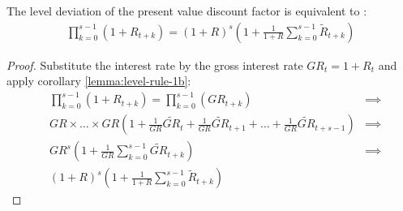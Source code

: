 \documentclass[../thesis.tex]{subfiles}
\begin{document}

\begin{lemma} \label{lemma:product-operator}
	
	The level deviation of the present value discount factor is equivalent to \cite[Lecture 13, p.6]{solis-garcia_ucb_2022}:
	\begin{align*}
		\prod_{k=0}^{s-1}(1+R_{t+k}) = (1 + R)^s \left( 1 + \frac{1}{1 + R} \sum_{k=0}^{s-1} \widetilde{R}_{t+k} \right)
	\end{align*}
	\begin{proof}
		Substitute the interest rate by the gross interest rate $GR_t = 1 + R_t$ and apply corollary \ref{lemma:level-rule-1b}:
		\begin{align*}
			& \prod_{k=0}^{s-1}(1+R_{t+k}) = \prod_{k=0}^{s-1}(GR_{t+k})
			&\implies \nonumber \\
			& GR \times \dots \times GR \left( 1 + \frac{1}{GR} \widetilde{GR}_t + \frac{1}{GR} \widetilde{GR}_{t+1} + \dots + \frac{1}{GR} \widetilde{GR}_{t+s-1} \right)
			&\implies \nonumber \\
			& GR^s \left( 1 + \frac{1}{GR} \sum_{k=0}^{s-1} \widetilde{GR}_{t+k} \right)
			&\implies \nonumber \\
			& (1 + R)^s \left( 1 + \frac{1}{1 + R} \sum_{k=0}^{s-1} \widetilde{R}_{t+k} \right) &\, \end{align*} \end{proof}
	
\end{lemma}

\begin{comment}



\end{comment}
\end{document}

